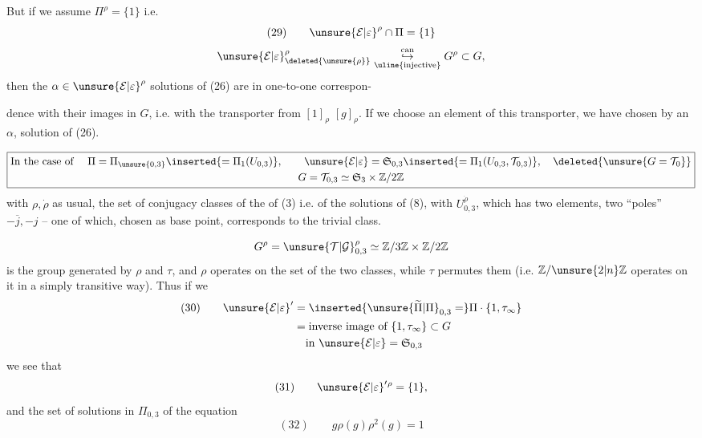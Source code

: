 But if we assume $\Pi^\rho=\{1\}$ i.e.
\[
(29)\qquad\unsure{\mathcal E|\varepsilon}^\rho\cap\Pi=\{1\}
\]
\[
\unsure{\mathcal E|\varepsilon}^\rho_{\deleted{\unsure{\rho}}}
\underset{\uline{\text{injective}}}{\overset{\mathrm{can}}{\hookrightarrow}}
G^\rho\subset G,
\]
then the $\alpha\in\unsure{\mathcal E|\varepsilon}^\rho$ solutions of (26) are in one-to-one correspon-


dence with their images \inserted{$\dot\alpha$} in $G$, i.e. with the transporter  from $[1]_\rho$  $[g]_\rho$.
If we choose an element of this transporter, we have chosen by  an $\alpha$, solution of (26).

\[
\boxed{\begin{gathered}
\text{In the case of }\quad
\Pi=\Pi_{\unsure{0,3}}\inserted{=\Pi_1(U_{0,3})},\qquad
\unsure{\mathcal E|\varepsilon}=\mathfrak S_{0,3}
\inserted{=\Pi_1(U_{0,3},\mathcal T_{0,3})},
\quad\deleted{\unsure{G=\mathcal T_0}}\\
G=\mathcal T_{0,3}\simeq\mathfrak S_3\times\mathbb Z/2\mathbb Z
\end{gathered}}
\]
with $\rho,\dot\rho$ as usual, the set of conjugacy classes of the  of (3) i.e. of the solutions of (8),  with $U_{0,3}^{\dot\rho}$, which has two elements,  two ``poles'' $-\overline j,-j$ -- one of which, chosen as base point, corresponds to the trivial class.

\[
G^\rho=\unsure{\mathcal T|\mathcal G}_{0,3}^{\rho}
\simeq\mathbb Z/3\mathbb Z\times\mathbb Z/2\mathbb Z
\]
is the group generated by $\rho$ and $\tau$, and $\rho$ operates  on the set of the two classes, while $\tau$ permutes them (i.e. $\mathbb Z/\unsure{2|n}\mathbb Z$  operates on it in a simply transitive way).
Thus if we 
\[
\begin{aligned}
(30)\qquad\unsure{\mathcal E|\varepsilon}'
&=\inserted{\unsure{\widetilde\Pi|\Pi}_{0,3}=}\Pi\cdot\{1,\tau_\infty\}\\
&=\text{inverse image of }\{1,\tau_\infty\}\subset G\\
&\phantom{={}}\text{in }\unsure{\mathcal E|\varepsilon}=\mathfrak S_{0,3}
\end{aligned}
\]
we see that
\[
(31)\qquad\unsure{\mathcal E|\varepsilon}'{}^\rho=\{1\},
\]
and the set of solutions in \uline{$\Pi_{0,3}$} of the equation
\[
(32)\qquad g\rho(g)\rho^2(g)=1
\]

